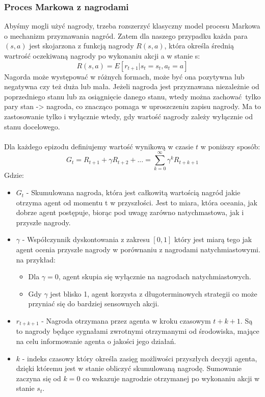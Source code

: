 \documentclass[a4paper, 10pt]{article}
\begin{document}
    \subsubsection{Proces Markowa z nagrodami}
    Abyśmy mogli użyć nagrody, trzeba rozszerzyć klasyczny model procesu Markowa o mechanizm przyznawania nagród.
    Zatem dla naszego przypadku każda para \( (s,a) \) jest skojarzona z funkcją nagrody \( R(s,a) \), która określa średnią wartrość oczekiwaną nagrody po wykonaniu
    akcji a w stanie s:
    \[ R(s,a) = E[r_{t+1}|s_t = s_t, a_t = a] \]
    Nagorda może występować w różnych formach, może być ona pozytywna lub negatywna czy też duża lub mała. Jeżeli nagroda jest
    przyznawana niezależnie od poprzedniego stanu lub za osiągnięcie danego stanu, wtedy można zachować tylko pary stan -> nagroda, co znacząco
    pomaga w uproszczeniu zapisu nagrody. Ma to zastosowanie tylko i wyłącznie wtedy, gdy wartość nagrody zależy wyłącznie 
    od stanu docelowego.
    \\ \\
    Dla każdego epizodu definiujemy wartość wynikową w czasie \( t \) w poniższy sposób:
    \[ G_t = R_{t+1} + \gamma R_{t+2} + ... = \sum_{k=0}^{\infty} \gamma^k R_{t+k+1} \]
    Gdzie:
    \begin{itemize}
        \item \( G_t \) - Skumulowana nagroda, która jest całkowitą wartością nagród jakie otrzyma agent od momentu t w przyszłości.
        Jest to miara, która oceania, jak dobrze agent postępuje, biorąc pod uwagę zarówno natychmastowa, jak i przyszłe nagrody.
        \item \( \gamma \) - Współczynnik dyskontowania z zakresu \( [0, 1] \) który jest miarą tego jak agent ocenia przyszłe nagrody w porównaniu z 
        nagrodami natychmiastowymi. na przykład:
        \begin{itemize}
            \item Dla \( \gamma = 0 \), agent skupia się wyłącznie na nagrodach natychmiastowych.
            \item Gdy \( \gamma \) jest blisko 1, agent korzysta z długoterminowych strategii co może przyniać się do bardziej sensownych akcji. 
        \end{itemize}
        \item \( r_{t+k+1} \) - Nagroda otrzymana przez agenta w kroku czasowym \( t + k + 1 \). Są to nagrody będące sygnałami zwrotnymi otrzymanymi
        od środowiska, mające na celu informowanie agenta o jakości jego działań.
        \item \( k \) - indeks czasowy który określa zasięg możliwości przyszłych decyzji agenta, dzięki któremu jest w stanie obliczyć skumulowaną nagrodę.
        Sumowanie zaczyna się od \( k = 0 \) co wskazuje nagrodzie otrzymanej po wykonaniu akcji w stanie \( s_t \).
    \end{itemize}
\end{document}
